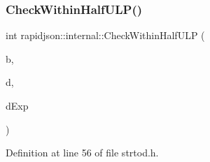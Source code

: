 \subsubsection{\texorpdfstring{CheckWithinHalfULP()}{CheckWithinHalfULP()}}
{\footnotesize\ttfamily int rapidjson\+::internal\+::\+Check\+Within\+Half\+U\+LP (\begin{DoxyParamCaption}\item[{double}]{b,  }\item[{const \mbox{\hyperlink{classrapidjson_1_1internal_1_1_big_integer}{Big\+Integer}} \&}]{d,  }\item[{int}]{d\+Exp }\end{DoxyParamCaption})}



Definition at line 56 of file strtod.\+h.


